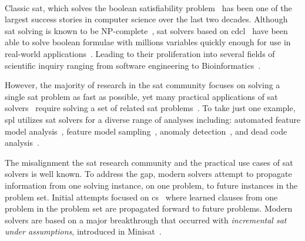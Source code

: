 ~\label{sec:introduction}


Classic \ac{sat}, which solves the boolean satisfiability
problem~\cite{10.5555/1550723} has been one of the largest success stories in
computer science over the last two decades. Although \ac{sat} solving is known
to be NP-complete~\cite{10.1145/800157.805047}, \ac{sat} solvers based on
\ac{cdcl}~\cite{Marques-Silva:1999:GSA:304491.304506,Silva:1997:GNS:244522.244560,10.5555/1867406.1867438}
have been able to solve boolean formulae with millions variables quickly enough
for use in real-world applications~\cite{10.5555/1557461}. Leading to their
proliferation into several fields of scientific inquiry ranging from software
engineering to
Bioinformatics~\cite{10.1007/11814948_16,10.1007/978-3-642-31612-8_12}.

However, the majority of research in the \ac{sat} community focuses on solving a
single \ac{sat} problem as fast as possible, yet many practical applications of
\ac{sat}
solvers~\cite{silva1997robust,10.1007/3-540-44798-9_4,10.1145/378239.379019,10.1145/1698759.1698762,Een_asingle-instance,een2003temporal,10.5555/1998496.1998520}
require solving a set of related \ac{sat}
problems~\cite{10.1007/3-540-44798-9_4, silva1997robust, een2003temporal}. To
take just one example, \ac{spl} utilizes \ac{sat} solvers for a diverse range of
analyses including: automated feature model
analysis~\cite{useBTRC05,GBT+19,TAK+:CSUR14}, feature model
sampling~\cite{MKR+:ICSE16,VAT+:SPLC18}, anomaly
detection~\cite{AKTS:FOSD16,KAT:TR16,MNS+:SPLC17}, and dead code
analysis~\cite{TLSS:EuroSys11}.

The misalignment the \ac{sat} research community and the practical use cases of
\ac{sat} solvers is well known. To address the gap, modern solvers attempt to
propagate information from one solving instance, on one problem, to future
instances in the problem set. Initial attempts focused on
\ac{cs}~\cite{10.1007/3-540-44798-9_4,10.1145/378239.379019} where learned
clauses from one problem in the problem set are propagated forward to future
problems. Modern solvers are based on a major breakthrough that occurred with
\emph{incremental \ac{sat} under assumptions}, introduced in
Minisat~\cite{10.1007/978-3-540-24605-3_37}.

